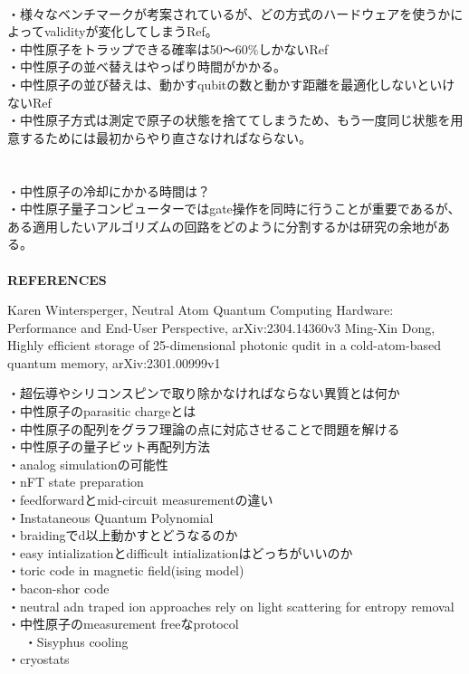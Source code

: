 \documentclass[a4paper,10.5pt]{ltjsarticle}
\begin{document}
\clearpage
{}\\
・様々なベンチマークが考案されているが、どの方式のハードウェアを使うかによってvalidityが変化してしまうRef\cite{1}。\\
・中性原子をトラップできる確率は50〜60\%しかないRef\cite{1}\\
・中性原子の並べ替えはやっぱり時間がかかる。\\
・中性原子の並び替えは、動かすqubitの数と動かす距離を最適化しないといけないRef\cite{1}\\
・中性原子方式は測定で原子の状態を捨ててしまうため、もう一度同じ状態を用意するためには最初からやり直さなければならない。\\
\\
\\
・中性原子の冷却にかかる時間は？\\
・中性原子量子コンピューターではgate操作を同時に行うことが重要であるが、ある適用したいアルゴリズムの回路をどのように分割するかは研究の余地がある。\\
\\
{\Large \bfseries REFERENCES}
\begin{thebibliography}{1}
\vspace{-1.5cm}
   Karen Wintersperger, Neutral Atom Quantum Computing Hardware: Performance and End-User Perspective, arXiv:2304.14360v3
   Ming-Xin Dong, Highly efficient storage of 25-dimensional photonic qudit in a cold-atom-based quantum memory, arXiv:2301.00999v1
\end{thebibliography}
\vspace{50pt}
・超伝導やシリコンスピンで取り除かなければならない異質とは何か\\
・中性原子のparasitic chargeとは\\
・中性原子の配列をグラフ理論の点に対応させることで問題を解ける\\
・中性原子の量子ビット再配列方法\\
・analog simulationの可能性\\
・nFT state preparation\\
・feedforwardとmid-circuit measurementの違い\\
・Instataneous Quantum Polynomial\\
・braidingでd以上動かすとどうなるのか\\
・easy intializationとdifficult intializationはどっちがいいのか\\
・toric code in magnetic field(ising model)\\
・bacon-shor code\\
・neutral adn traped ion approaches rely on light scattering for entropy removal\\
・中性原子のmeasurement freeなprotocol\\　
・Sisyphus cooling\\
・cryostats\\
\\
\end{document}
